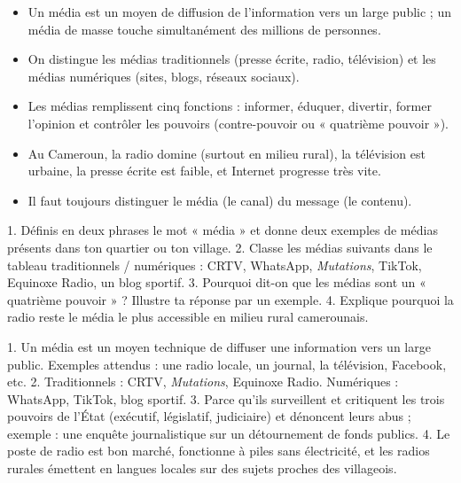 \documentclass[11pt]{article}
\newcommand{\cle}[1]{{\popxbold\color{popdark}#1}}
\begin{document}
\begin{aretenir}
\begin{itemize}
\item Un \cle{média} est un moyen de diffusion de l'information vers un large public ; un \cle{média de masse} touche simultanément des millions de personnes.
\item On distingue les \cle{médias traditionnels} (presse écrite, radio, télévision) et les \cle{médias numériques} (sites, blogs, réseaux sociaux).
\item Les médias remplissent cinq fonctions : informer, éduquer, divertir, former l'opinion et contrôler les pouvoirs (\cle{contre-pouvoir} ou « quatrième pouvoir »).
\item Au Cameroun, la radio domine (surtout en milieu rural), la télévision est urbaine, la presse écrite est faible, et Internet progresse très vite.
\item Il faut toujours distinguer le \cle{média} (le canal) du \cle{message} (le contenu).
\end{itemize}
\end{aretenir}

\begin{exercice}
1. Définis en deux phrases le mot « média » et donne deux exemples de médias présents dans ton quartier ou ton village.
2. Classe les médias suivants dans le tableau traditionnels / numériques : CRTV, WhatsApp, \emph{Mutations}, TikTok, Equinoxe Radio, un blog sportif.
3. Pourquoi dit-on que les médias sont un « quatrième pouvoir » ? Illustre ta réponse par un exemple.
4. Explique pourquoi la radio reste le média le plus accessible en milieu rural camerounais.
\end{exercice}

\begin{corrige}[Exercice n°1]
1. Un média est un moyen technique de diffuser une information vers un large public. Exemples attendus : une radio locale, un journal, la télévision, Facebook, etc.
2. Traditionnels : CRTV, \emph{Mutations}, Equinoxe Radio. Numériques : WhatsApp, TikTok, blog sportif.
3. Parce qu'ils surveillent et critiquent les trois pouvoirs de l'État (exécutif, législatif, judiciaire) et dénoncent leurs abus ; exemple : une enquête journalistique sur un détournement de fonds publics.
4. Le poste de radio est bon marché, fonctionne à piles sans électricité, et les radios rurales émettent en langues locales sur des sujets proches des villageois.
\end{corrige}
\end{document}
